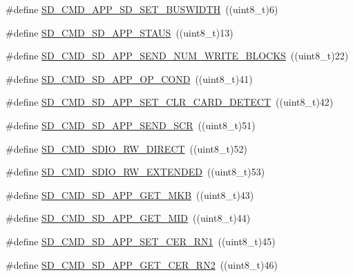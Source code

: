 \begin{DoxyCompactItemize}
\item 
\#define \hyperlink{group__sd__card_ga1b28ab176d0d05d7f971809aeb07b758}{S\+D\+\_\+\+C\+M\+D\+\_\+\+A\+P\+P\+\_\+\+S\+D\+\_\+\+S\+E\+T\+\_\+\+B\+U\+S\+W\+I\+D\+TH}~((uint8\+\_\+t)6)
\item 
\#define \hyperlink{group__sd__card_ga2984265566ee729869324cf5b842a601}{S\+D\+\_\+\+C\+M\+D\+\_\+\+S\+D\+\_\+\+A\+P\+P\+\_\+\+S\+T\+A\+US}~((uint8\+\_\+t)13)
\item 
\#define \hyperlink{group__sd__card_gae38cb2fd8f0e7cb42c76e3b11055c424}{S\+D\+\_\+\+C\+M\+D\+\_\+\+S\+D\+\_\+\+A\+P\+P\+\_\+\+S\+E\+N\+D\+\_\+\+N\+U\+M\+\_\+\+W\+R\+I\+T\+E\+\_\+\+B\+L\+O\+C\+KS}~((uint8\+\_\+t)22)
\item 
\#define \hyperlink{group__sd__card_ga980954ae3a961028fd59f67a1a30a7de}{S\+D\+\_\+\+C\+M\+D\+\_\+\+S\+D\+\_\+\+A\+P\+P\+\_\+\+O\+P\+\_\+\+C\+O\+ND}~((uint8\+\_\+t)41)
\item 
\#define \hyperlink{group__sd__card_ga713f0d9a7c99b7becea80f232c024b59}{S\+D\+\_\+\+C\+M\+D\+\_\+\+S\+D\+\_\+\+A\+P\+P\+\_\+\+S\+E\+T\+\_\+\+C\+L\+R\+\_\+\+C\+A\+R\+D\+\_\+\+D\+E\+T\+E\+CT}~((uint8\+\_\+t)42)
\item 
\#define \hyperlink{group__sd__card_ga11c23db52041ccaca4a2dbcafca62c88}{S\+D\+\_\+\+C\+M\+D\+\_\+\+S\+D\+\_\+\+A\+P\+P\+\_\+\+S\+E\+N\+D\+\_\+\+S\+CR}~((uint8\+\_\+t)51)
\item 
\#define \hyperlink{group__sd__card_ga09d3d2d61d003d6bf75c3fb128e86dbb}{S\+D\+\_\+\+C\+M\+D\+\_\+\+S\+D\+I\+O\+\_\+\+R\+W\+\_\+\+D\+I\+R\+E\+CT}~((uint8\+\_\+t)52)
\item 
\#define \hyperlink{group__sd__card_gaf40f42039cf756a3805800b48e2790ed}{S\+D\+\_\+\+C\+M\+D\+\_\+\+S\+D\+I\+O\+\_\+\+R\+W\+\_\+\+E\+X\+T\+E\+N\+D\+ED}~((uint8\+\_\+t)53)
\item 
\#define \hyperlink{group__sd__card_ga4f8828be53bb69d6436c03c9c2f427c6}{S\+D\+\_\+\+C\+M\+D\+\_\+\+S\+D\+\_\+\+A\+P\+P\+\_\+\+G\+E\+T\+\_\+\+M\+KB}~((uint8\+\_\+t)43)
\item 
\#define \hyperlink{group__sd__card_gaf2e3bf3ef0ee9a3cbb20d43700521ea7}{S\+D\+\_\+\+C\+M\+D\+\_\+\+S\+D\+\_\+\+A\+P\+P\+\_\+\+G\+E\+T\+\_\+\+M\+ID}~((uint8\+\_\+t)44)
\item 
\#define \hyperlink{group__sd__card_ga120a1adc8c10961c831b197f0fd51f76}{S\+D\+\_\+\+C\+M\+D\+\_\+\+S\+D\+\_\+\+A\+P\+P\+\_\+\+S\+E\+T\+\_\+\+C\+E\+R\+\_\+\+R\+N1}~((uint8\+\_\+t)45)
\item 
\#define \hyperlink{group__sd__card_gab8fbec70c55b91b2227dd592b7257eae}{S\+D\+\_\+\+C\+M\+D\+\_\+\+S\+D\+\_\+\+A\+P\+P\+\_\+\+G\+E\+T\+\_\+\+C\+E\+R\+\_\+\+R\+N2}~((uint8\+\_\+t)46)

\end{DoxyCompactItemize}
